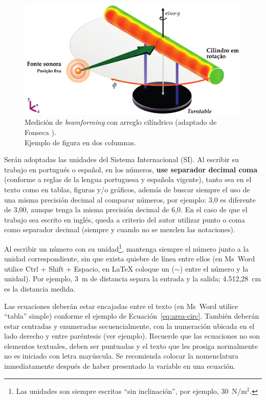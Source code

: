 \documentclass[12pt, a4paper, twoside, twocolumn]{article}
\begin{document}
\begin{figure}[!ht] %
	\centering
	\includegraphics[width=0.74\linewidth]{figs/Measurement-Scheme-Fonseca-2013.pdf}%
	\caption{Medición de \textit{beamforming} con arreglo cilíndrico (adaptado de Fonseca \cite{Fonseca-2013}).\\ Ejemplo de figura en dos columnas.}%
	\label{fig:beamforming}%
\end{figure}

Serán adoptadas las unidades del Sistema Internacional (SI). Al escribir su trabajo en portugués o español, en los números, \textbf{use separador decimal coma} (conforme a reglas de la lengua portuguesa y española vigente), tanto sea en el texto como en tablas, figuras y/o gráficos, además de buscar siempre el uso de una misma precisión decimal al comparar números, por ejemplo: 3,0 es diferente de 3,00, aunque tenga la misma precisión decimal de 6,0.
En el caso de que el trabajo sea escrito en inglés, queda a criterio del autor utilizar punto o coma como separador decimal (siempre y cuando no se mezclen las notaciones).

Al escribir un número con su unidad\footnote{Las unidades son siempre escritas ``sin inclinación'', por ejemplo, 30~N/m$^2$.}, mantenga siempre el número junto a la unidad correspondiente, sin que exista quiebre de línea entre ellos (en Ms~Word utilice Ctrl + Shift + Espacio, en \LaTeX\xspace coloque un ($\sim$) entre el número y la unidad). Por ejemplo, 3~m de distancia separa la entrada y la salida; 4.512,28~cm es la distancia medida.

Las ecuaciones deberán estar encajadas entre el texto (en Ms~Word utilice ``tabla'' simple) conforme el ejemplo de Ecuación~\eqref{eq:area-circ}. También deberán estar centradas y enumeradas secuencialmente, con la numeración ubicada en el lado derecho y entre paréntesis (ver ejemplo). Recuerde que las ecuaciones no son elementos textuales, deben ser puntuadas y el texto que les prosiga normalmente no es iniciado con letra mayúscula. Se recomienda colocar la nomenclatura inmediatamente después de haber presentado la variable en una ecuación.
\end{document}
